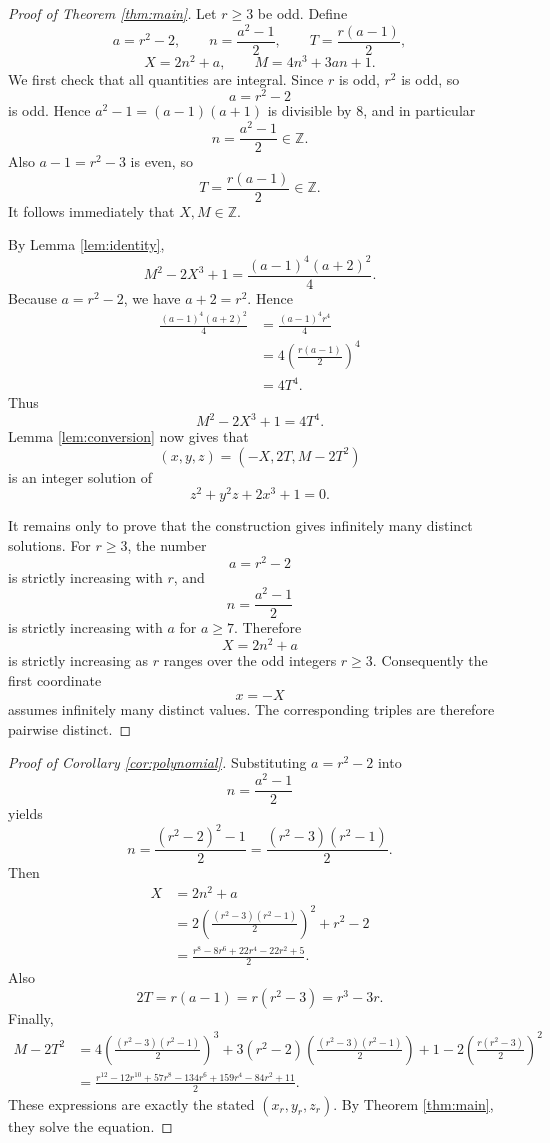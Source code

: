 \documentclass[11pt]{article}
\theoremstyle{remark}
\begin{document}
\begin{proof}[Proof of Theorem \ref{thm:main}]
Let \(r\geq 3\) be odd.  Define
\[
        a=r^2-2,
        \qquad
        n=\frac{a^2-1}{2},
        \qquad
        T=\frac{r(a-1)}2,
\]
\[
        X=2n^2+a,
        \qquad
        M=4n^3+3an+1.
\]
We first check that all quantities are integral.  Since \(r\) is odd, \(r^2\) is odd, so
\[
        a=r^2-2
\]
is odd.  Hence \(a^2-1=(a-1)(a+1)\) is divisible by \(8\), and in particular
\[
        n=\frac{a^2-1}{2}\in\mathbb Z.
\]
Also \(a-1=r^2-3\) is even, so
\[
        T=\frac{r(a-1)}2\in\mathbb Z.
\]
It follows immediately that \(X,M\in\mathbb Z\).

By Lemma \ref{lem:identity},
\[
        M^2-2X^3+1=\frac{(a-1)^4(a+2)^2}{4}.
\]
Because \(a=r^2-2\), we have \(a+2=r^2\).  Hence
\begin{align*}
        \frac{(a-1)^4(a+2)^2}{4}
        &=\frac{(a-1)^4r^4}{4} \\
        &=4\left(\frac{r(a-1)}2\right)^4 \\
        &=4T^4.
\end{align*}
Thus
\[
        M^2-2X^3+1=4T^4.
\]
Lemma \ref{lem:conversion} now gives that
\[
        (x,y,z)=(-X,2T,M-2T^2)
\]
is an integer solution of
\[
        z^2+y^2z+2x^3+1=0.
\]

It remains only to prove that the construction gives infinitely many distinct solutions.  For \(r\geq 3\), the number
\[
        a=r^2-2
\]
is strictly increasing with \(r\), and
\[
        n=\frac{a^2-1}{2}
\]
is strictly increasing with \(a\) for \(a\geq 7\).  Therefore
\[
        X=2n^2+a
\]
is strictly increasing as \(r\) ranges over the odd integers \(r\geq 3\).  Consequently the first coordinate
\[
        x=-X
\]
assumes infinitely many distinct values.  The corresponding triples are therefore pairwise distinct.
\end{proof}

\begin{proof}[Proof of Corollary \ref{cor:polynomial}]
Substituting \(a=r^2-2\) into
\[
        n=\frac{a^2-1}{2}
\]
yields
\[
        n=\frac{(r^2-2)^2-1}{2}
         =\frac{(r^2-3)(r^2-1)}{2}.
\]
Then
\begin{align*}
        X
        &=2n^2+a \\
        &=2\left(\frac{(r^2-3)(r^2-1)}{2}\right)^2+r^2-2 \\
        &=\frac{r^8-8r^6+22r^4-22r^2+5}{2}.
\end{align*}
Also
\[
        2T=r(a-1)=r(r^2-3)=r^3-3r.
\]
Finally,
\begin{align*}
        M-2T^2
        &=4\left(\frac{(r^2-3)(r^2-1)}{2}\right)^3
          +3(r^2-2)\left(\frac{(r^2-3)(r^2-1)}{2}\right)+1
          -2\left(\frac{r(r^2-3)}{2}\right)^2 \\
        &=\frac{r^{12}-12r^{10}+57r^8-134r^6+159r^4-84r^2+11}{2}.
\end{align*}
These expressions are exactly the stated \((x_r,y_r,z_r)\).  By Theorem \ref{thm:main}, they solve the equation.
\end{proof}
\end{document}
